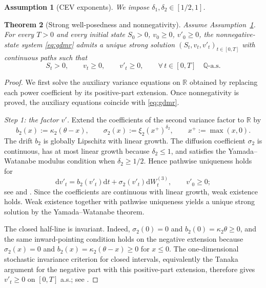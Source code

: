 \documentclass[pdflatex,sn-mathphys-num]{sn-jnl}
\theoremstyle{thmstyleone}%
\newtheorem{theorem}{Theorem}[section]
\theoremstyle{thmstylethree}%
\newtheorem{assumption}[theorem]{Assumption}
\theoremstyle{thmstyletwo}%
\newcommand{\dd}{\mathrm d}
\newcommand{\Q}{\mathbb Q}
\newcommand{\R}{\mathbb R}
\begin{document}
\begin{assumption}[CEV exponents]\label{ass:delta-range}
We impose $\delta_1,\delta_2\in[1/2,1]$.
\end{assumption}

\begin{theorem}[Strong well-posedness and nonnegativity]\label{thm:wellposed}
Assume Assumption~\ref{ass:delta-range}. For every $T>0$ and every initial state $S_0>0$, $v_0\ge0$, $v'_0\ge0$, the nonnegative-state system \eqref{eq:gdmr} admits a unique strong solution $(S_t,v_t,v'_t)_{t\in[0,T]}$ with continuous paths such that
\[
S_t>0,\qquad v_t\ge 0,\qquad v'_t\ge 0,\qquad \forall\,t\in[0,T]\quad \Q\text{-a.s.}
\]
\end{theorem}

\begin{proof}
We first solve the auxiliary variance equations on $\R$ obtained by replacing each power coefficient by its positive-part extension. Once nonnegativity is proved, the auxiliary equations coincide with \eqref{eq:gdmr}.

\emph{Step 1: the factor $v'$.}
Extend the coefficients of the second variance factor to $\R$ by
\[
b_2(x):=\kappa_2(\theta-x),\qquad \sigma_2(x):=\xi_2(x^+)^{\delta_2},\qquad x^+:=\max(x,0).
\]
The drift $b_2$ is globally Lipschitz with linear growth. The diffusion coefficient $\sigma_2$ is continuous, has at most linear growth because $\delta_2\le1$, and satisfies the Yamada--Watanabe modulus condition when $\delta_2\ge1/2$. Hence pathwise uniqueness holds for
\[
\dd v'_t=b_2(v'_t)\dd t+\sigma_2(v'_t)\dd W^{(3)}_t,\qquad v'_0\ge 0;
\]
see \cite{yamada1971uniqueness} and \cite[Ch.~5]{karatzas1991brownian}. Since the coefficients are continuous with linear growth, weak existence holds. Weak existence together with pathwise uniqueness yields a unique strong solution by the Yamada--Watanabe theorem.

\noindent
The closed half-line is invariant. Indeed, $\sigma_2(0)=0$ and $b_2(0)=\kappa_2\theta\ge0$, and the same inward-pointing condition holds on the negative extension because $\sigma_2(x)=0$ and $b_2(x)=\kappa_2(\theta-x)\ge0$ for $x\le0$. The one-dimensional stochastic invariance criterion for closed intervals, equivalently the Tanaka argument for the negative part with this positive-part extension, therefore gives $v'_t\ge0$ on $[0,T]$ a.s.; see \cite[Ch.~5]{karatzas1991brownian}.


\end{proof}
\end{document}
